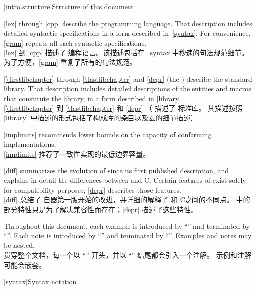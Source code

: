 [intro.structure]{Structure of this document}

\pnum
{}%
%
\ref{lex} through \ref{cpp} describe the \Cpp{} programming
language. That description includes detailed syntactic specifications in
a form described in~\ref{syntax}. For convenience, \ref{gram}
repeats all such syntactic specifications. \\
\ref{lex} 到 \ref{cpp} 描述了 \Cpp{} 编程语言。该描述包括在~\ref{syntax}中秒速的句法规范细节。
为了方便，\ref{gram} 重复了所有的句法规范。

\pnum
\ref{\firstlibchapter} through \ref{\lastlibchapter} and \ref{depr}
(the ) describe the \Cpp{} standard library.
That description includes detailed descriptions of the
entities and macros
that constitute the library, in a form described in \ref{library}. \\
\ref{\firstlibchapter} 到 \ref{\lastlibchapter} 和 \ref{depr} 
（ 描述了 \Cpp{} 标准库。
其描述按照 \ref{library} 中描述的形式包括了构成库的条目以及宏的细节描述）

\pnum
\ref{implimits} recommends lower bounds on the capacity of conforming
implementations. \\
\ref{implimits} 推荐了一致性实现的最低边界容量。

\pnum
\ref{diff} summarizes the evolution of \Cpp{} since its first
published description, and explains in detail the differences between
\Cpp{} and C\@. Certain features of \Cpp{} exist solely for compatibility
purposes; \ref{depr} describes those features. \\
\ref{diff} 总结了 \Cpp{} 自器第一版开始的改进，并详细的解释了 \Cpp{} 和 C\@ 之间的不同点。
\Cpp{} 中的部分特性只是为了解决兼容性而存在；\ref{depr} 描述了这些特性。

\pnum
Throughout this document, each example is introduced by
``'' and terminated by ``''. Each note is
introduced by ``'' and terminated by ``''. Examples
and notes may be nested. \\ %
贯穿整个文档，每一个以 ``'' 开头，并以 ``'' 结尾都会引入一个注解。
示例和注解可能会嵌套。

[syntax]{Syntax notation}


